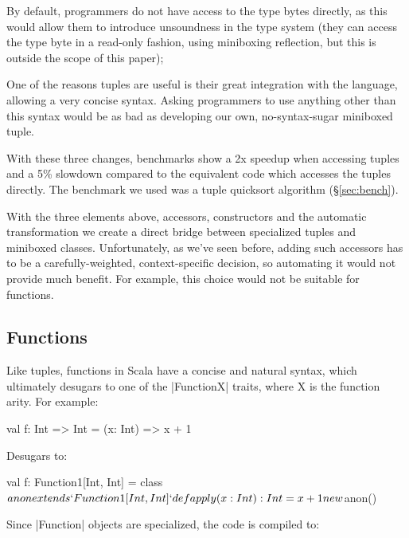 \begin{compactitem}
 \item By default, programmers do not have access to the type bytes directly, as this would allow them to introduce unsoundness in the type system (they can access the type byte in a read-only fashion, using miniboxing reflection, but this is outside the scope of this paper);
 \item One of the reasons tuples are useful is their great integration with the language, allowing a very concise syntax. Asking programmers to use anything other than this syntax would be as bad as developing our own, no-syntax-sugar miniboxed tuple.
\end{compactitem}

With these three changes, benchmarks show a 2x speedup when accessing tuples and a 5\% slowdown compared to the equivalent code which accesses the tuples directly. The benchmark we used was a tuple quicksort algorithm (\S\ref{sec:bench}).

With the three elements above, accessors, constructors and the automatic transformation we create a direct bridge between specialized tuples and miniboxed classes. Unfortunately, as we've seen before, adding such accessors has to be a carefully-weighted, context-specific decision, so automating it would not provide much benefit. For example, this choice would not be suitable for functions.

\subsection{Functions}
\label{sec:functions}

Like tuples, functions in Scala have a concise and natural syntax, which ultimately desugars to one of the |FunctionX| traits, where X is the function arity. For example:

\begin{lstlisting-nobreak}
 val f: Int => Int = (x: Int) => x + 1
\end{lstlisting-nobreak}

Desugars to:

\begin{lstlisting-nobreak}
 val f: Function1[Int, Int] = {
   class $anon extends `Function1[Int, Int]` {
     def apply(x: Int): Int = x + 1
   }
   new $anon()
 }
\end{lstlisting-nobreak}

Since |Function| objects are specialized, the code is compiled to:

